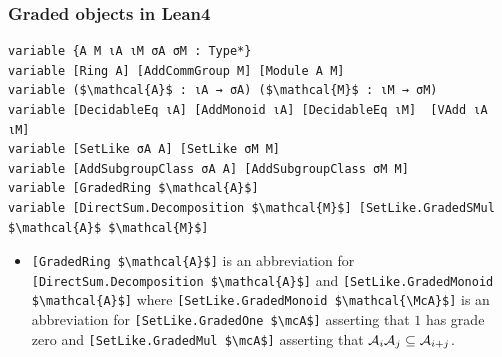 \documentclass[9pt]{beamer}
\begin{document}
\begin{frame}[fragile]
\frametitle{Graded objects in Lean4}

\begin{lstlisting}[mathescape=true, extendedchars=true]
variable {A M ιA ιM σA σM : Type*} 
variable [Ring A] [AddCommGroup M] [Module A M]
variable ($\mathcal{A}$ : ιA → σA) ($\mathcal{M}$ : ιM → σM)
variable [DecidableEq ιA] [AddMonoid ιA] [DecidableEq ιM]  [VAdd ιA ιM]
variable [SetLike σA A] [SetLike σM M]
variable [AddSubgroupClass σA A] [AddSubgroupClass σM M] 
variable [GradedRing $\mathcal{A}$] 
variable [DirectSum.Decomposition $\mathcal{M}$] [SetLike.GradedSMul $\mathcal{A}$ $\mathcal{M}$]
\end{lstlisting}
\begin{itemize}
  \item\lstinline[mathescape=true]|[GradedRing $\mathcal{A}$]| is an abbreviation for \lstinline[mathescape=true]|[DirectSum.Decomposition $\mathcal{A}$]| and 
\lstinline[mathescape=true]|[SetLike.GradedMonoid $\mathcal{A}$]| where \lstinline[mathescape=true]|[SetLike.GradedMonoid $\mathcal{\McA}$]| is an abbreviation for 
\lstinline[mathescape=true]|[SetLike.GradedOne $\mcA$]| asserting that $1$ has grade zero and \lstinline[mathescape=true]|[SetLike.GradedMul $\mcA$]| asserting that $\mathcal{A}_i\mathcal{A}_j \subseteq \mathcal{A}_{i+j}$.
\end{itemize}
\end{frame}
\end{document}
